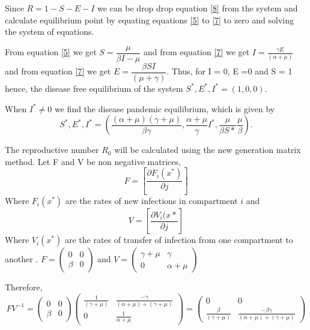  
Since $R = 1- S - E - I$
we can be drop drop equation \ref{8} from the system and  calculate equilibrium point by equating equations \ref{5} to \ref{7} to zero and solving the system of equations.

From equation \eqref{5} we get
$S = \dfrac{\mu}{\beta I - \mu}$ and from equation \ref{7} we get $I = \frac{\gamma E}{ (\alpha + \mu)}$ and from equation \ref{7} we get $ E = \dfrac{ \beta S I}{(\mu + \gamma)}.$ Thus, for I = 0, E =0 and S = 1 hence, the disease free equilibrium of the system $S^*, E^*, I^* = (1,0,0)$.

 When $I^* \neq 0$ we find the disease pandemic equilibrium, which is given by
\begin{equation*}
S^*, E^*, I^*  = \left(\frac{(\alpha + \mu)(\gamma + \mu)}{\beta \gamma} , \frac{\alpha + \mu }{ \gamma} I^*, \frac{\mu}{\beta S*} \frac{\mu}{\beta} \right).
\end{equation*}

The reproductive number $R_0$  will be calculated using the new generation matrix method. Let F and V be non negative matrices,
\begin{equation}
F = \left[ \frac{\partial F_i (x^*)}{\partial j}\right]
\end{equation}  Where  $F_i (x^*)$ are the rates of new infections in compartment $i$ and 
\begin{equation}
 V = \left[\dfrac{\partial V_i(x*}{\partial j} \right]
\end{equation}
  Where $V_i (x^*)$ are the rates of transfer of infection from one compartment to another \citep{van2002reproduction}.
  $F =\left(\begin{array}{cc} 
0&0 \\ \beta&0
\end{array} \right)$ and $V = \left(\begin{array}{cc} \gamma + \mu & \gamma \\ 0& \alpha + \mu \end{array} \right)$


Therefore,
\begin{equation}\label{4.2.29}
FV^{-1} = \left(\begin{array}{cc} 
0&0 \\ \beta&0
\end{array} \right) \left(\begin{array}{cc}
\frac{1}{(\gamma + \mu)}&  \frac{-\gamma}{(\alpha +\mu)+ (\gamma + \mu)}\\ 0& \frac{1}{\alpha + \mu}  

\end{array} \right) = \left(\begin{array}{cc} 0&0 \\
\frac{\beta}{(\gamma + \mu)} &\frac{- \beta\gamma}{(\alpha +\mu)+ (\gamma + \mu)} 
\end{array}\right)
\end{equation}

